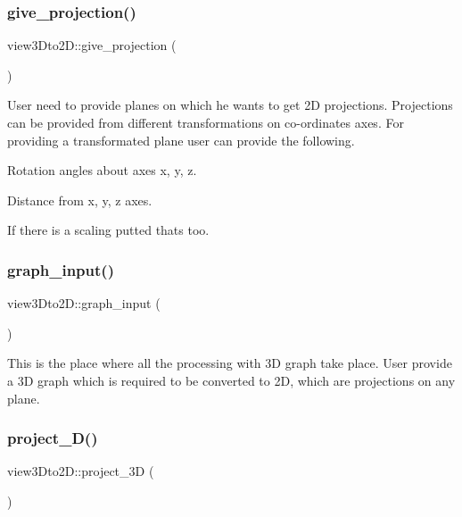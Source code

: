 \subsubsection{\texorpdfstring{give\+\_\+projection()}{give\_projection()}}
{\footnotesize\ttfamily view3\+Dto2\+D\+::give\+\_\+projection (\begin{DoxyParamCaption}{ }\end{DoxyParamCaption})\hspace{0.3cm}{\ttfamily [inline]}}

User need to provide planes on which he wants to get 2D projections. Projections can be provided from different transformations on co-\/ordinates axes. For providing a transformated plane user can provide the following.
\begin{DoxyEnumerate}
\item Rotation angles about axes x, y, z.
\item Distance from x, y, z axes.
\item If there is a scaling putted thats too.
\end{DoxyEnumerate}\mbox{\label{classview3Dto2D_ab11291f6c3ea5835a15c069ce33c3f9f}} 
\subsubsection{\texorpdfstring{graph\+\_\+input()}{graph\_input()}}
{\footnotesize\ttfamily view3\+Dto2\+D\+::graph\+\_\+input (\begin{DoxyParamCaption}{ }\end{DoxyParamCaption})\hspace{0.3cm}{\ttfamily [inline]}}

This is the place where all the processing with 3D graph take place. User provide a 3D graph which is required to be converted to 2D, which are projections on any plane.\mbox{\label{classview3Dto2D_a8b6a91f689534c80d15da1124d69e214}} 
\subsubsection{\texorpdfstring{project\+\_\+D()}{project\_3D()}}
{\footnotesize\ttfamily view3\+Dto2\+D\+::project\+\_\+3D (\begin{DoxyParamCaption}{ }\end{DoxyParamCaption})\hspace{0.3cm}{\ttfamily [inline]}}


